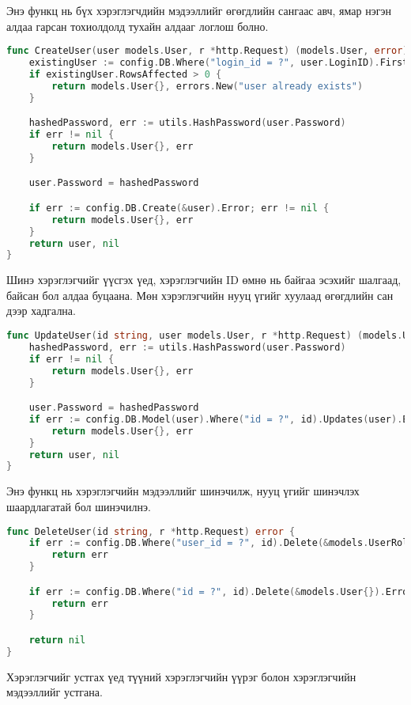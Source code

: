 Энэ функц нь бүх хэрэглэгчдийн мэдээллийг өгөгдлийн сангаас авч, ямар нэгэн алдаа гарсан тохиолдолд тухайн алдааг логлош болно.

\begin{lstlisting}[language=Go, caption=Create user function, frame=single]
func CreateUser(user models.User, r *http.Request) (models.User, error) {
	existingUser := config.DB.Where("login_id = ?", user.LoginID).First(&models.User{})
	if existingUser.RowsAffected > 0 {
		return models.User{}, errors.New("user already exists")
	}

	hashedPassword, err := utils.HashPassword(user.Password)
	if err != nil {
		return models.User{}, err
	}

	user.Password = hashedPassword

	if err := config.DB.Create(&user).Error; err != nil {
		return models.User{}, err
	}
	return user, nil
}
\end{lstlisting}

Шинэ хэрэглэгчийг үүсгэх үед, хэрэглэгчийн ID өмнө нь байгаа эсэхийг шалгаад, байсан бол алдаа буцаана. Мөн хэрэглэгчийн нууц үгийг хуулаад өгөгдлийн сан дээр хадгална.

\begin{lstlisting}[language=Go, caption=Update user function, frame=single]
func UpdateUser(id string, user models.User, r *http.Request) (models.User, error) {
	hashedPassword, err := utils.HashPassword(user.Password)
	if err != nil {
		return models.User{}, err
	}

	user.Password = hashedPassword
	if err := config.DB.Model(user).Where("id = ?", id).Updates(user).Error; err != nil {
		return models.User{}, err
	}
	return user, nil
}
\end{lstlisting}

Энэ функц нь хэрэглэгчийн мэдээллийг шинэчилж, нууц үгийг шинэчлэх шаардлагатай бол шинэчилнэ.

\begin{lstlisting}[language=Go, caption=Delete user function, frame=single]
func DeleteUser(id string, r *http.Request) error {
	if err := config.DB.Where("user_id = ?", id).Delete(&models.UserRole{}).Error; err != nil {
		return err
	}

	if err := config.DB.Where("id = ?", id).Delete(&models.User{}).Error; err != nil {
		return err
	}

	return nil
}
\end{lstlisting}

Хэрэглэгчийг устгах үед түүний хэрэглэгчийн үүрэг болон хэрэглэгчийн мэдээллийг устгана.

